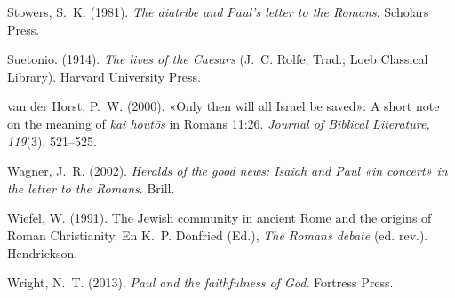 \documentclass[11pt,letterpaper]{article}
\newcommand{\refapa}[1]{\par{\RaggedRight\hangindent=1.27cm\hangafter=1\noindent #1\par}\vspace{4pt}}
\begin{document}
\refapa{Stowers, S.~K. (1981). \emph{The diatribe and Paul's letter to the Romans}. Scholars Press.}
\refapa{Suetonio. (1914). \emph{The lives of the Caesars} (J.~C. Rolfe, Trad.; Loeb Classical Library). Harvard University Press.}
\refapa{van der Horst, P.~W. (2000). «Only then will all Israel be saved»: A short note on the meaning of \emph{kai houtōs} in Romans 11:26. \emph{Journal of Biblical Literature, 119}(3), 521--525.}
\refapa{Wagner, J.~R. (2002). \emph{Heralds of the good news: Isaiah and Paul «in concert» in the letter to the Romans}. Brill.}
\refapa{Wiefel, W. (1991). The Jewish community in ancient Rome and the origins of Roman Christianity. En K.~P. Donfried (Ed.), \emph{The Romans debate} (ed. rev.). Hendrickson.}
\refapa{Wright, N.~T. (2013). \emph{Paul and the faithfulness of God}. Fortress Press.}
\end{document}
